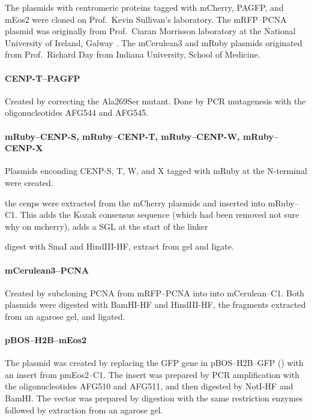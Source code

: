    The plasmids with centromeric proteins tagged with mCherry, PAGFP, and
    mEos2 were cloned on Prof.~Kevin Sullivan's laboratory.
    The mRFP--PCNA plasmid was originally from Prof.~Ciaran Morrisson
    laboratory at the National University of Ireland, Galway
    \citep{cloning-mRFP-PCNA-by-Helen}.
    The mCerulean3 and mRuby plasmids originated from Prof.~Richard Day
    from Indiana University, School of Medicine.

    \paragraph{CENP-T--PAGFP}
      Created by correcting the Ala269Ser mutant.  Done by PCR mutagenesis
      with the oligonucleotides AFG544 and AFG545.

    \paragraph{mRuby--CENP-S, mRuby--CENP-T, mRuby--CENP-W, mRuby--CENP-X}
      Plasmids enconding CENP-S, T, W, and X tagged with mRuby at the
      N-terminal were created.

      the cenps were extracted from the mCherry plasmids and inserted into
      mRuby--C1.  This adds the Kozak consensus sequence (which had been
      removed not sure why on mcherry), adds a SGL at the start of the linker

      digest with SmaI and HindIII-HF, extract from gel and ligate.



    \paragraph{mCerulean3--PCNA}
      Created by subcloning PCNA from mRFP--PCNA into into mCerulean--C1.
      Both plasmids were digested with BamHI-HF and HindIII-HF, the fragments
      extracted from an agarose gel, and ligated.

    \paragraph{pBOS--H2B--mEos2}
      The plasmid was created by replacing the GFP gene in pBOS--H2B--GFP
      () with an insert from pmEos2--C1.
      The insert was prepared by PCR amplification with the oligonucleotides
      AFG510 and AFG511, and then digested by NotI-HF and BamHI.
      The vector was prepared by digestion with the same restriction
      enzymes followed by extraction from an agarose gel.

